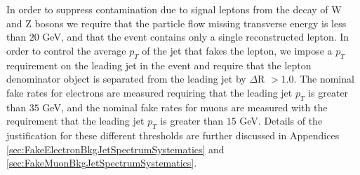 In order to suppress 
contamination due to signal leptons from the decay of W and Z bosons we require
that the particle flow missing transverse energy is less than $20$ GeV, and that 
the event contains only a single reconstructed lepton. In order to control the 
average $p_{T}$ of the jet that fakes the lepton, we impose a $p_{T}$ requirement 
on the leading jet in the event and require that the lepton denominator object is 
separated from the leading jet by $\Delta$R $ > 1.0$. The nominal fake rates for
electrons are measured requiring that the leading jet $p_{T}$ is greater than 
$35$ GeV, and the nominal fake rates for muons are measured with the requirement 
that the leading jet $p_{T}$ is greater than $15$ GeV. Details of the justification for
these different thresholds are further discussed in Appendices 
\ref{sec:FakeElectronBkgJetSpectrumSystematics} and 
\ref{sec:FakeMuonBkgJetSpectrumSystematics}.



